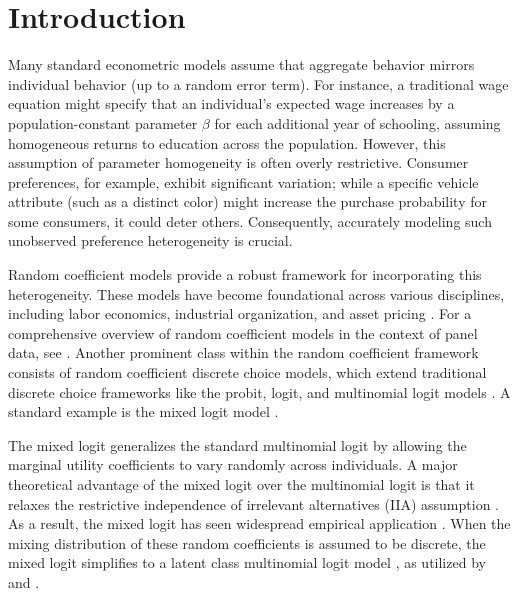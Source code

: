 \section{Introduction}
\label{sec:introduction}

Many standard econometric models assume that aggregate behavior mirrors individual behavior (up to a random error term). 
For instance, a traditional wage equation might specify that an individual's expected wage increases by a population-constant parameter $\beta$ for each additional year of schooling, assuming homogeneous returns to education across the population. 
However, this assumption of parameter homogeneity is often overly restrictive. 
Consumer preferences, for example, exhibit significant variation; while a specific vehicle attribute (such as a distinct color) might increase the purchase probability for some consumers, it could deter others. 
Consequently, accurately modeling such unobserved preference heterogeneity is crucial.

Random coefficient models provide a robust framework for incorporating this heterogeneity. 
These models have become foundational across various disciplines, including labor economics, industrial organization, and asset pricing \citep[e.g.][]{BerryLevinsohnPakes1995, CarneiroHeckmanVytlacil2011, BelzilHansen2007, KoijenYogo2019}. 
For a comprehensive overview of random coefficient models in the context of panel data, see \citet{HsiaoPesaran2008}. 
Another prominent class within the random coefficient framework consists of random coefficient discrete choice models, which extend traditional discrete choice frameworks like the probit, logit, and multinomial logit models \citep[see][]{CameronTrivedi2005}. 
A standard example is the mixed logit model \citep[chap.~6]{Train2009}.

The mixed logit generalizes the standard multinomial logit by allowing the marginal utility coefficients to vary randomly across individuals. 
A major theoretical advantage of the mixed logit over the multinomial logit is that it relaxes the restrictive independence of irrelevant alternatives (IIA) assumption \citep{Train2009}. 
As a result, the mixed logit has seen widespread empirical application \citep[e.g.][]{NicoletNegenbornAtasoy2022,YinCherchi2024,ZhouWangYangGanLiuZi2025}. 
When the mixing distribution of these random coefficients is assumed to be discrete, the mixed logit simplifies to a latent class multinomial logit model \citep{Train2009}, as utilized by \citet{WangYangSongSia2014} and \citet{LiGaoYangLiu2022}. 

